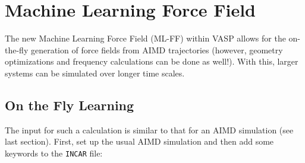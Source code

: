 \documentclass[a4paper,11pt]{article}
\begin{document}
\section{Machine Learning Force Field}

The new Machine Learning Force Field (ML-FF) within VASP allows for the on-the-fly generation of force fields from
AIMD trajectories (however, geometry optimizations and frequency calculations can be done as well!). 
With this, larger systems can be simulated over longer time scales.

\subsection{On the Fly Learning}

The input for such a calculation is similar to that for an AIMD simulation (see last section).
First, set up the usual AIMD simulation and then add some keywords to the \texttt{INCAR} file:
\end{document}
